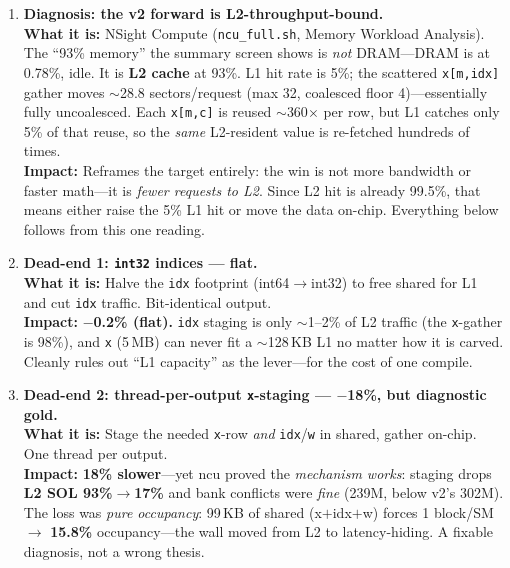 \documentclass[11pt]{article}
\newcommand{\what}[1]{\textbf{What it is:} #1}
\newcommand{\impact}[1]{\textbf{Impact:} #1}
\begin{document}
\begin{enumerate}[leftmargin=*, resume]

\item \textbf{Diagnosis: the v2 forward is L2-throughput-bound.}\\
\what{NSight Compute (\texttt{ncu\_full.sh}, Memory Workload Analysis). The ``93\% memory'' the
summary screen shows is \emph{not} DRAM---DRAM is at 0.78\%, idle. It is \textbf{L2 cache} at 93\%.
L1 hit rate is 5\%; the scattered \texttt{x[m,idx]} gather moves $\sim$28.8 sectors/request (max 32,
coalesced floor 4)---essentially fully uncoalesced. Each \texttt{x[m,c]} is reused $\sim$360$\times$
per row, but L1 catches only 5\% of that reuse, so the \emph{same} L2-resident value is re-fetched
hundreds of times.}\\
\impact{Reframes the target entirely: the win is not more bandwidth or faster math---it is
\emph{fewer requests to L2}. Since L2 hit is already 99.5\%, that means either raise the 5\% L1 hit
or move the data on-chip. Everything below follows from this one reading.}

\item \textbf{Dead-end 1: \texttt{int32} indices --- flat.}\\
\what{Halve the \texttt{idx} footprint (int64$\to$int32) to free shared for L1 and cut \texttt{idx}
traffic. Bit-identical output.}\\
\impact{\textbf{$-$0.2\% (flat).} \texttt{idx} staging is only $\sim$1--2\% of L2 traffic (the
\texttt{x}-gather is 98\%), and \texttt{x} (5\,MB) can never fit a $\sim$128\,KB L1 no matter how it
is carved. Cleanly rules out ``L1 capacity'' as the lever---for the cost of one compile.}

\item \textbf{Dead-end 2: thread-per-output \texttt{x}-staging --- $-$18\%, but diagnostic gold.}\\
\what{Stage the needed \texttt{x}-row \emph{and} \texttt{idx}/\texttt{w} in shared, gather on-chip.
One thread per output.}\\
\impact{\textbf{18\% slower}---yet ncu proved the \emph{mechanism works}: staging drops \textbf{L2
SOL 93\%$\to$17\%} and bank conflicts were \emph{fine} (239M, below v2's 302M). The loss was
\emph{pure occupancy}: 99\,KB of shared (x$+$idx$+$w) forces 1 block/SM $\to$ \textbf{15.8\%}
occupancy---the wall moved from L2 to latency-hiding. A fixable diagnosis, not a wrong thesis.}


\end{enumerate}
\end{document}
